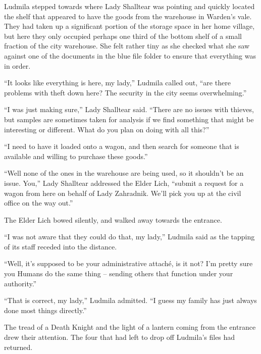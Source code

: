 Ludmila stepped towards where Lady Shalltear was pointing and quickly located the shelf that appeared to have the goods from the warehouse in Warden’s vale. They had taken up a significant portion of the storage space in her home village, but here they only occupied perhaps one third of the bottom shelf of a small fraction of the city warehouse. She felt rather tiny as she checked what she saw against one of the documents in the blue file folder to ensure that everything was in order.

 

“It looks like everything is here, my lady,” Ludmila called out, “are there problems with theft down here? The security in the city seems overwhelming.”

 

“I was just making sure,” Lady Shalltear said. “There are no issues with thieves, but samples are sometimes taken for analysis if we find something that might be interesting or different. What do you plan on doing with all this?”

 

“I need to have it loaded onto a wagon, and then search for someone that is available and willing to purchase these goods.”

 

“Well none of the ones in the warehouse are being used, so it shouldn’t be an issue. You,” Lady Shalltear addressed the Elder Lich, “submit a request for a wagon from here on behalf of Lady Zahradnik. We’ll pick you up at the civil office on the way out.”

 

The Elder Lich bowed silently, and walked away towards the entrance.

 

“I was not aware that they could do that, my lady,” Ludmila said as the tapping of its staff receded into the distance.

 

“Well, it’s supposed to be your administrative attaché, is it not? I’m pretty sure you Humans do the same thing – sending others that function under your authority.”

 

“That is correct, my lady,” Ludmila admitted. “I guess my family has just always done most things directly.”

 

The tread of a Death Knight and the light of a lantern coming from the entrance drew their attention. The four that had left to drop off Ludmila’s files had returned.

